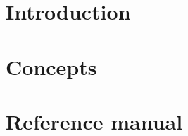 \documentclass[a4paper,oneside,12pt]{book}
\begin{document}




\newpage


\tableofcontents

\newpage
\part{Introduction}
\hypertarget{Part:Introduction}{}


\newpage
\part{Concepts}
\hypertarget{Part:Concepts}{}


\newpage


\newpage


\newpage
\part{Reference manual}
\hypertarget{Part:ReferenceManual}{}

\end{document}
